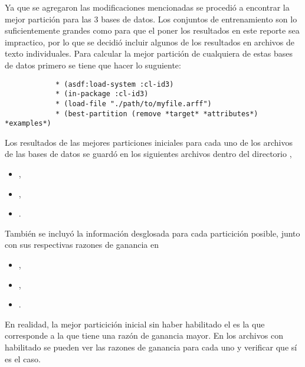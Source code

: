 \begin{itemize}
\begin{solution}
        Ya que se agregaron las modificaciones mencionadas se procedió a encontrar la mejor partición para las 3 bases de datos. Los conjuntos de entrenamiento son lo suficientemente grandes como para que el poner los resultados en este reporte sea impractico, por lo que se decidió incluir algunos de los resultados en archivos de texto individuales. Para calcular la mejor partición de cualquiera de estas bases de datos primero se tiene que hacer lo suguiente:
        \begin{verbatim}
            * (asdf:load-system :cl-id3)
            * (in-package :cl-id3)
            * (load-file "./path/to/myfile.arff")
            * (best-partition (remove *target* *attributes*) *examples*)
        \end{verbatim}
        
        Los resultados de las mejores particiones iniciales para cada uno de los archivos de las bases de datos se guardó en los siguientes archivos dentro del directorio ,
        \begin{itemize}
            \item {}, 
            \item {}, 
            \item {}.
        \end{itemize}
        También se incluyó la información desglosada para cada particición posible, junto con sus respectivas razones de ganancia en
        \begin{itemize}
            \item {}, 
            \item {}, 
            \item {}.
        \end{itemize}
        En realidad, la mejor particición inicial sin haber habilitado el  es la que corresponde a la que tiene una razón de ganancia mayor. En los archivos con  habilitado se pueden ver las razones de ganancia para cada uno y verificar que sí es el caso.
        

\end{solution}
\end{itemize}
